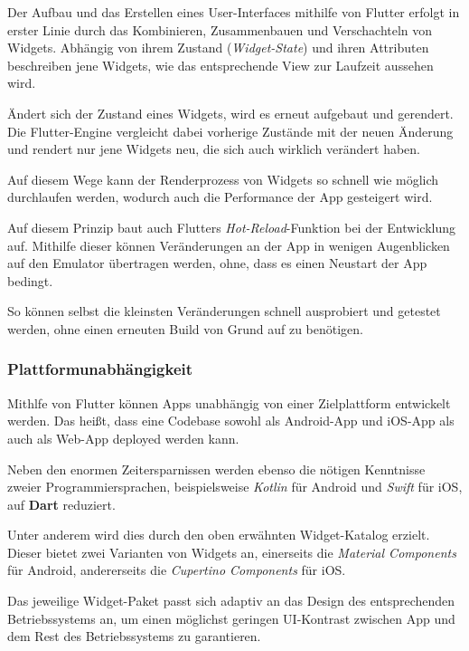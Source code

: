 Der Aufbau und das Erstellen eines User-Interfaces mithilfe von Flutter erfolgt in erster Linie
durch das Kombinieren, Zusammenbauen und Verschachteln von Widgets.
Abhängig von ihrem Zustand (\textit{Widget-State}) und ihren Attributen beschreiben jene Widgets, wie das entsprechende
View zur Laufzeit aussehen wird.

Ändert sich der Zustand eines Widgets, wird es erneut aufgebaut und gerendert. Die Flutter-Engine 
vergleicht dabei vorherige Zustände mit der neuen Änderung und rendert nur jene Widgets neu, die
sich auch wirklich verändert haben.

Auf diesem Wege kann der Renderprozess von Widgets so schnell wie möglich durchlaufen werden, wodurch auch die Performance der App gesteigert wird.

Auf diesem Prinzip baut auch Flutters \textit{Hot-Reload}-Funktion bei der Entwicklung auf. Mithilfe dieser
können Veränderungen an der App in wenigen Augenblicken auf den Emulator übertragen werden, ohne, dass es einen
Neustart der App bedingt.

So können selbst die kleinsten Veränderungen schnell ausprobiert und getestet werden, ohne einen erneuten Build von Grund auf
zu benötigen.

\subsubsection{Plattformunabhängigkeit}

Mithlfe von Flutter können Apps unabhängig von einer Zielplattform entwickelt werden. Das heißt, dass eine Codebase
sowohl als Android-App und iOS-App als auch als Web-App deployed werden kann.

Neben den enormen Zeitersparnissen werden ebenso die nötigen Kenntnisse zweier Programmiersprachen, beispielsweise
\textit{Kotlin} für Android und \textit{Swift} für iOS, auf \textbf{Dart} reduziert.

Unter anderem wird dies durch den oben erwähnten Widget-Katalog erzielt. Dieser bietet zwei Varianten
von Widgets an, einerseits die \textit{Material Components} für Android, andererseits die \textit{Cupertino Components}
für iOS.

Das jeweilige Widget-Paket passt sich adaptiv an das Design des entsprechenden Betriebssystems an, um einen möglichst
geringen UI-Kontrast zwischen App und dem Rest des Betriebssystems zu garantieren.


